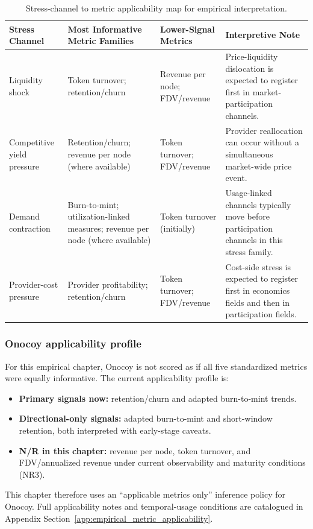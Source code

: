 \begin{table}[ht]
    \centering
    \small
    \renewcommand{\arraystretch}{1.2}
    \setlength{\tabcolsep}{4pt}
    \begin{tabularx}{\textwidth}{@{}>{\raggedright\arraybackslash}p{}>{\raggedright\arraybackslash}p{}>{\raggedright\arraybackslash}p{}X@{}}
        \toprule
        \textbf{Stress Channel} & \textbf{Most Informative Metric Families} & \textbf{Lower-Signal Metrics} & \textbf{Interpretive Note} \\
        \midrule
        Liquidity shock & Token turnover; retention/churn & Revenue per node; FDV/revenue & Price-liquidity dislocation is expected to register first in market-participation channels. \\
        Competitive yield pressure & Retention/churn; revenue per node (where available) & Token turnover; FDV/revenue & Provider reallocation can occur without a simultaneous market-wide price event. \\
        Demand contraction & Burn-to-mint; utilization-linked measures; revenue per node (where available) & Token turnover (initially) & Usage-linked channels typically move before participation channels in this stress family. \\
        Provider-cost pressure & Provider profitability; retention/churn & Token turnover; FDV/revenue & Cost-side stress is expected to register first in economics fields and then in participation fields. \\
        \bottomrule
    \end{tabularx}
    \caption{Stress-channel to metric applicability map for empirical interpretation.}
    \label{tab:stress_metric_applicability_map}
\end{table}

\subsubsection{Onocoy applicability profile}
\label{subsec:onocoy_metric_applicability_profile}
For this empirical chapter, Onocoy is not scored as if all five standardized metrics were equally informative. The current applicability profile is:
\begin{itemize}
    \item \textbf{Primary signals now:} retention/churn and adapted burn-to-mint trends.
    \item \textbf{Directional-only signals:} adapted burn-to-mint and short-window retention, both interpreted with early-stage caveats.
    \item \textbf{N/R in this chapter:} revenue per node, token turnover, and FDV/annualized revenue under current observability and maturity conditions (NR3).
\end{itemize}
This chapter therefore uses an ``applicable metrics only'' inference policy for Onocoy. Full applicability notes and temporal-usage conditions are catalogued in Appendix Section~\ref{app:empirical_metric_applicability}.

